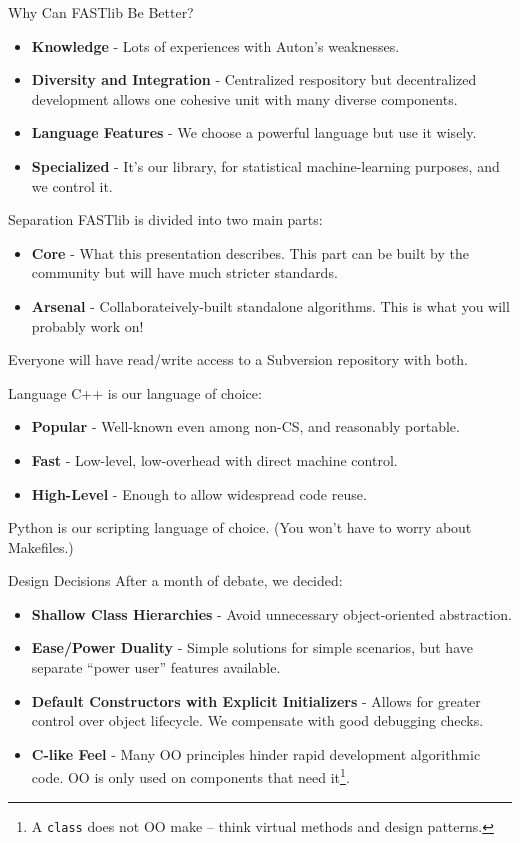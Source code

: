 \documentclass[pdf,colorBG,slideColor]{prosper}
\newcommand{\itemt}[1]{\item {\bf #1} -}
\begin{document}
\begin{slide}{Why Can FASTlib Be Better?}
 \begin{itemize}
  \itemt{Knowledge} Lots of experiences with Auton's weaknesses.
  \itemt{Diversity and Integration}
  Centralized respository but decentralized development allows one cohesive unit with many diverse components.
  \itemt{Language Features}
  We choose a powerful language but use it wisely.
  \itemt{Specialized} It's our library, for statistical machine-learning purposes, and we control it.
 \end{itemize}
\end{slide}

\begin{slide}{Separation}
 FASTlib is divided into two main parts:
 \begin{itemize}
 \itemt{Core} What this presentation describes.  This part can be built by
 the community but will have much stricter standards.
 \itemt{Arsenal} Collaborateively-built standalone algorithms.
 This is what you will probably work on!
 \end{itemize}
 Everyone will have read/write access to a Subversion repository with both.
\end{slide}

\begin{slide}{Language}
 C++ is our language of choice:
 \begin{itemize}
 \itemt{Popular} Well-known even among non-CS, and reasonably portable.
 \itemt{Fast} Low-level, low-overhead with direct machine control.
 \itemt{High-Level} Enough to allow widespread code reuse.
 \end{itemize}
 Python is our scripting language of choice.
 (You won't have to worry about Makefiles.)
\end{slide}

\begin{slide}{Design Decisions}
 After a month of debate, we decided:
 \begin{itemize}
  \itemt{Shallow Class Hierarchies}
  Avoid unnecessary object-oriented abstraction.
  \itemt{Ease/Power Duality}
  Simple solutions for simple scenarios, but have separate ``power user'' features available.
  \itemt{Default Constructors with Explicit Initializers}
  Allows for greater control over object lifecycle.
  We compensate with good debugging checks.
  \itemt{C-like Feel}
  Many OO principles hinder rapid development algorithmic code.
  OO is only used on components that need it\footnote{A {\tt class} does not OO make -- think virtual methods and design patterns.}.
 \end{itemize}
\end{slide}
\end{document}
